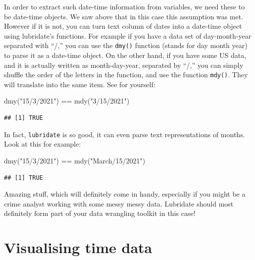 \documentclass[
]{book}
\makeatletter
\newenvironment{Shaded}{\begin{snugshade}}{\end{snugshade}}
\newcommand{\FunctionTok}[1]{\textcolor[rgb]{0,0,0}{#1}}
\newcommand{\NormalTok}[1]{#1}
\newcommand{\SpecialCharTok}[1]{\textcolor[rgb]{0,0,0}{#1}}
\newcommand{\StringTok}[1]{\textcolor[rgb]{0.5,0.5,0.5}{#1}}
\newenvironment{kframe}{%
\medskip{}
\setlength{\fboxsep}{.8em}
 \def\at@end@of@kframe{}%
 \ifinner\ifhmode%
  \def\at@end@of@kframe{\end{minipage}}%
  \begin{minipage}{\columnwidth}%
 \fi\fi%
 \def\FrameCommand##1{\hskip\@totalleftmargin \hskip-\fboxsep
 \colorbox{shadecolor}{##1}\hskip-\fboxsep
     \hskip-\linewidth \hskip-\@totalleftmargin \hskip\columnwidth}%
 \MakeFramed {\advance\hsize-\width
   \@totalleftmargin\z@ \linewidth\hsize
   \@setminipage}}%
 {\par\unskip\endMakeFramed%
 \at@end@of@kframe}
\renewenvironment{Shaded}{\begin{kframe}}{\end{kframe}}
\makeatother
\begin{document}
In order to extract such date-time information from variables, we need these to be date-time objects. We saw above that in this case this assumption was met. However if it is not, you can turn text column of dates into a date-time object using lubridate's functions. For example if you have a data set of day-month-year separated with ``/,'' you can use the \texttt{dmy()} function (stands for day month year) to parse it as a date-time object. On the other hand, if you have some US data, and it is actually written as month-day-year, separated by ``/,'' you can simply shuffle the order of the letters in the function, and use the function \texttt{mdy()}. They will translate into the same item. See for yourself:

\begin{Shaded}
\begin{Highlighting}[]
\FunctionTok{dmy}\NormalTok{(}\StringTok{"15/3/2021"}\NormalTok{) }\SpecialCharTok{==} \FunctionTok{mdy}\NormalTok{(}\StringTok{"3/15/2021"}\NormalTok{)}
\end{Highlighting}
\end{Shaded}

\begin{verbatim}
## [1] TRUE
\end{verbatim}

In fact, \texttt{lubridate} is so good, it can even parse text representations of months. Look at this for example:

\begin{Shaded}
\begin{Highlighting}[]
\FunctionTok{dmy}\NormalTok{(}\StringTok{"15/3/2021"}\NormalTok{) }\SpecialCharTok{==} \FunctionTok{mdy}\NormalTok{(}\StringTok{"March/15/2021"}\NormalTok{)}
\end{Highlighting}
\end{Shaded}

\begin{verbatim}
## [1] TRUE
\end{verbatim}

Amazing stuff, which will definitely come in handy, especially if you might be a crime analyst working with some messy messy data. Lubridate should most definitely form part of your data wrangling toolkit in this case!

\hypertarget{visualising-time-data}{%
\section{Visualising time data}\label{visualising-time-data}}
\end{document}
